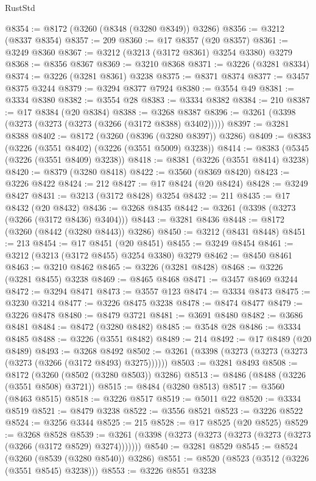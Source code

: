\begin{lexlean}{RustStd}
\begin{coremodule}
{\begin{coremodule}
{{{{{{{{{{{{{{{{{{{{{{{{{{@8354 := @8172 (@3260 (@8348 (@3280 @8349)) @3286)
@8356 := @3212 (@8337 @8354)
@8357 := 209
@8360 := @17 @8357 (@20 @8357)
@8361 := @3249 @8360
@8367 := @3212 (@3213 (@3172 @8361) @3254 @3380) @3279
@8368 := @8356 @8367
@8369 := @3210 @8368
@8371 := @3226 (@3281 @8334)
@8374 := @3226 (@3281 @8361) @3238
@8375 := @8371 @8374
@8377 := @3457 @8375 @3244
@8379 := @3294 @8377 @7924
@8380 := @3554 @49
@8381 := @3334 @8380
@8382 := @3554 @28
@8383 := @3334 @8382
@8384 := 210
@8387 := @17 @8384 (@20 @8384)
@8388 := @3268 @8387
@8396 := @3261 (@3398 (@3273 (@3273 (@3273 (@3266 (@3172 @8388) @3402)))))
@8397 := @3281 @8388
@8402 := @8172 (@3260 (@8396 (@3280 @8397)) @3286)
@8409 := @8383 (@3226 (@3551 @8402) (@3226 (@3551 @5009) @3238))
@8414 := @8383 (@5345 (@3226 (@3551 @8409) @3238))
@8418 := @8381 (@3226 (@3551 @8414) @3238)
@8420 := @8379 (@3280 @8418)
@8422 := @3560 (@8369 @8420)
@8423 := @3226 @8422
@8424 := 212
@8427 := @17 @8424 (@20 @8424)
@8428 := @3249 @8427
@8431 := @3213 (@3172 @8428) @3254
@8432 := 211
@8435 := @17 @8432 (@20 @8432)
@8436 := @3268 @8435
@8442 := @3261 (@3398 (@3273 (@3266 (@3172 @8436) @3404)))
@8443 := @3281 @8436
@8448 := @8172 (@3260 (@8442 (@3280 @8443)) @3286)
@8450 := @3212 (@8431 @8448)
@8451 := 213
@8454 := @17 @8451 (@20 @8451)
@8455 := @3249 @8454
@8461 := @3212 (@3213 (@3172 @8455) @3254 @3380) @3279
@8462 := @8450 @8461
@8463 := @3210 @8462
@8465 := @3226 (@3281 @8428)
@8468 := @3226 (@3281 @8455) @3238
@8469 := @8465 @8468
@8471 := @3457 @8469 @3244
@8472 := @3294 @8471
@8473 := @3557 @123
@8474 := @3334 @8473
@8475 := @3230 @3214
@8477 := @3226 @8475 @3238
@8478 := @8474 @8477
@8479 := @3226 @8478
@8480 := @8479 @3721
@8481 := @3691 @8480
@8482 := @3686 @8481
@8484 := @8472 (@3280 @8482)
@8485 := @3548 @28
@8486 := @3334 @8485
@8488 := @3226 (@3551 @8482)
@8489 := 214
@8492 := @17 @8489 (@20 @8489)
@8493 := @3268 @8492
@8502 := @3261 (@3398 (@3273 (@3273 (@3273 (@3273 (@3266 (@3172 @8493) @3275))))))
@8503 := @3281 @8493
@8508 := @8172 (@3260 (@8502 (@3280 @8503)) @3286)
@8513 := @8486 (@8488 (@3226 (@3551 @8508) @3721))
@8515 := @8484 (@3280 @8513)
@8517 := @3560 (@8463 @8515)
@8518 := @3226 @8517
@8519 := @5011 @22
@8520 := @3334 @8519
@8521 := @8479 @3238
@8522 := @3556 @8521
@8523 := @3226 @8522
@8524 := @3256 @3344
@8525 := 215
@8528 := @17 @8525 (@20 @8525)
@8529 := @3268 @8528
@8539 := @3261 (@3398 (@3273 (@3273 (@3273 (@3273 (@3273 (@3266 (@3172 @8529) @3274)))))))
@8540 := @3281 @8529
@8545 := @8524 (@3260 (@8539 (@3280 @8540)) @3286)
@8551 := @8520 (@8523 (@3512 (@3226 (@3551 @8545) @3238)))
@8553 := @3226 @8551 @3238
}}}}}}}}}}}}}}}}}}}}}}}}}}
\end{coremodule}}
\end{coremodule}
\end{lexlean}
